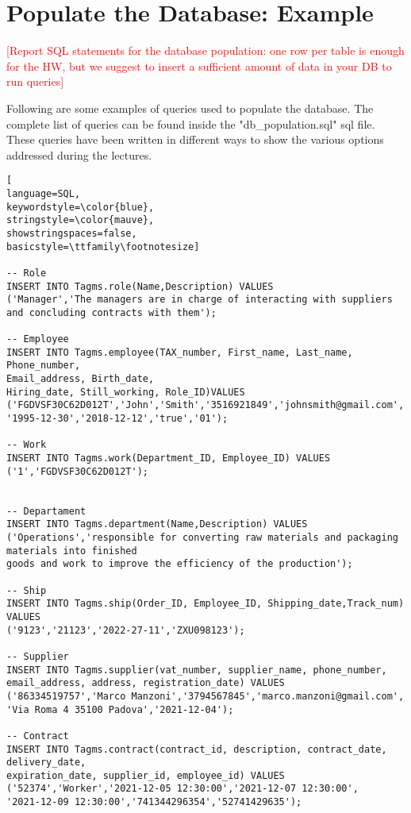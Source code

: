 
\section{Populate the Database: Example}
\textcolor{red}{[Report SQL statements for the database population: one row per table is enough for the HW, but we suggest to insert a sufficient amount of data in your DB to run queries]}

Following are some examples of queries used to populate the database. The complete list of queries can be found inside the "db_population.sql" sql file. These queries have been written in different ways to show the various options addressed during the lectures.

\begin{lstlisting}[
language=SQL,
keywordstyle=\color{blue},
stringstyle=\color{mauve},
showstringspaces=false,
basicstyle=\ttfamily\footnotesize]

-- Role
INSERT INTO Tagms.role(Name,Description) VALUES 
('Manager','The managers are in charge of interacting with suppliers
and concluding contracts with them');

-- Employee
INSERT INTO Tagms.employee(TAX_number, First_name, Last_name, Phone_number,
Email_address, Birth_date,
Hiring_date, Still_working, Role_ID)VALUES
('FGDVSF30C62D012T','John','Smith','3516921849','johnsmith@gmail.com',
'1995-12-30','2018-12-12','true','01');

-- Work
INSERT INTO Tagms.work(Department_ID, Employee_ID) VALUES 
('1','FGDVSF30C62D012T');


-- Departament
INSERT INTO Tagms.department(Name,Description) VALUES
('Operations','responsible for converting raw materials and packaging materials into finished
goods and work to improve the efficiency of the production');

-- Ship
INSERT INTO Tagms.ship(Order_ID, Employee_ID, Shipping_date,Track_num) VALUES 
('9123','21123','2022-27-11','ZXU098123');

-- Supplier
INSERT INTO Tagms.supplier(vat_number, supplier_name, phone_number, 
email_address, address, registration_date) VALUES
('86334519757','Marco Manzoni','3794567845','marco.manzoni@gmail.com',
'Via Roma 4 35100 Padova','2021-12-04');

-- Contract
INSERT INTO Tagms.contract(contract_id, description, contract_date, delivery_date, 
expiration_date, supplier_id, employee_id) VALUES 
('52374','Worker','2021-12-05 12:30:00','2021-12-07 12:30:00',
'2021-12-09 12:30:00','741344296354','52741429635');


\end{lstlisting}
